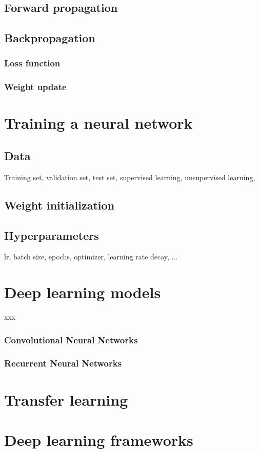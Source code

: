 \subsection{Forward propagation}


\subsection{Backpropagation}

\subsubsection{Loss function}

\subsubsection{Weight update}




\section{Training a neural network}

\subsection{Data}
Training set, validation set, test set, supervised learning, unsupervised learning,

\subsection{Weight initialization}

\subsection{Hyperparameters}
lr, batch size, epochs, optimizer, learning rate decay, ...




\section{Deep learning models}
xxx

\subsubsection{Convolutional Neural Networks}


\subsubsection{Recurrent Neural Networks}




\section{Transfer learning}




\section{Deep learning frameworks}